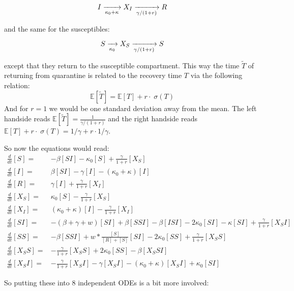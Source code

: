 \documentclass[a4paper,10pt]{article}
\begin{document}
\begin{equation}
 I\xrightarrow[\kappa_0+\kappa]{}X_I 
 \xrightarrow[\gamma/(1+r)]{} R\\
\end{equation}

and the same for the susceptibles:

\begin{equation}
 S\xrightarrow[\kappa_0]{}X_S 
 \xrightarrow[\gamma/(1+r)]{} S\\
\end{equation}

except that they return to the susceptible compartment. This way the time $\widetilde T$ of returning from quarantine is related to the recovery time $T$ via the following relation:
\begin{equation}
\mathbb E[\widetilde T]= \mathbb E[T] +r \cdot \;\sigma(T)
\end{equation}
And for $r=1$ we would be one standard deviation away from the mean. The left handside reads $\mathbb E[\widetilde T]=\frac{1}{\gamma/(1+r)}$ and the right handside reads $\mathbb E[T] +r \cdot \;\sigma(T) = 1/\gamma + r\cdot 1/\gamma$.

So now the equations would read:
\begin{align}
 \frac{d}{dt} [S]
 =&
 -\beta [SI] - \kappa_0[S] +\frac{\gamma}{1+r}[X_S]
 \\
 \frac{d}{dt} [I]
 =&
 \beta [SI] - \gamma [I] - (\kappa_0+\kappa)[I] 
 \\
 \frac{d}{dt} [R]
 =&
\gamma [I] +\frac{\gamma}{1+r}[X_I]
 \\
 \frac{d}{dt} [X_S]
 =&
\kappa_0 [S] - \frac{\gamma}{1+r}[X_S]
 \\
 \frac{d}{dt} [X_I]
 =&
(\kappa_0 +\kappa) [I] - \frac{\gamma}{1+r}[X_I]
 \\
 \frac{d}{dt} [SI]
 =&
 -(\beta+\gamma+w)[SI] + \beta[SSI] -\beta[ISI] -2\kappa_0 [SI] - \kappa [SI] + \frac{\gamma}{1+r} [X_{S}I] 
 \\
 \frac{d}{dt} [SS]
 =&
- \beta [SSI] + w*\frac{[S]}{[R]+[S]} [SI] -2\kappa_0 [SS] + \frac{\gamma}{1+r} [X_{S}S]  \\
 \frac{d}{dt} [X_{S}S]
 =&
 -\frac{\gamma}{1+r} [X_{S}S] + 2\kappa_0[SS]
 -\beta [X_{S}SI]
 \\
 \frac{d}{dt} [X_{S}I]
 =&
 -\frac{\gamma}{1+r} [X_{S}I] - \gamma [X_{S}I] -(\kappa_0+\kappa)[X_{S}I] + \kappa_0 [SI]
 \end{align}
 
 So putting these into 8 independent ODEs is a bit more involved:
 
\end{document}
